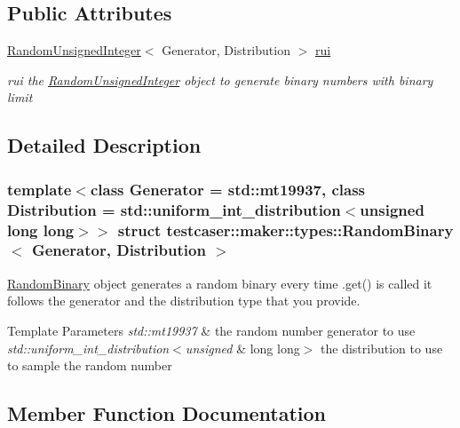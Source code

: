 \subsection*{Public Attributes}
\begin{DoxyCompactItemize}
\item 
\mbox{\label{structtestcaser_1_1maker_1_1types_1_1RandomBinary_a387cd99ad534bb762a37e931a227925e}} 
\hyperlink{classtestcaser_1_1maker_1_1types_1_1RandomUnsignedInteger}{Random\+Unsigned\+Integer}$<$ Generator, Distribution $>$ \hyperlink{structtestcaser_1_1maker_1_1types_1_1RandomBinary_a387cd99ad534bb762a37e931a227925e}{rui}
\begin{DoxyCompactList}\small\item\em rui the \hyperlink{classtestcaser_1_1maker_1_1types_1_1RandomUnsignedInteger}{Random\+Unsigned\+Integer} object to generate binary numbers with binary limit \end{DoxyCompactList}\end{DoxyCompactItemize}


\subsection{Detailed Description}
\subsubsection*{template$<$class Generator = std\+::mt19937, class Distribution = std\+::uniform\+\_\+int\+\_\+distribution$<$unsigned long long$>$$>$\newline
struct testcaser\+::maker\+::types\+::\+Random\+Binary$<$ Generator, Distribution $>$}

\hyperlink{structtestcaser_1_1maker_1_1types_1_1RandomBinary}{Random\+Binary} object generates a random binary every time .get() is called it follows the generator and the distribution type that you provide. 


\begin{DoxyTemplParams}{Template Parameters}
{\em std\+::mt19937} & the random number generator to use \\
\hline
{\em std\+::uniform\+\_\+int\+\_\+distribution$<$unsigned} & long long$>$ the distribution to use to sample the random number \\
\hline
\end{DoxyTemplParams}


\subsection{Member Function Documentation}
\mbox{\label{structtestcaser_1_1maker_1_1types_1_1RandomBinary_a469154b51a27681c713c8b93ec1626b5}} 

